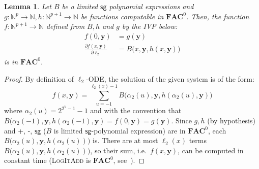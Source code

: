 \documentclass[11pt, oneside]{article}
\newenvironment{toappendix}{}{}
\newcommand{\fun}[1]{\mathsf{#1}}
\newcommand{\sB}{B}
\newcommand{\Nat}{\mathbb{N}}
\newcommand{\AC}{\mathbf{FAC}}
\newcommand{\tu}[1]{\mathbf{#1}}
\newtheorem{lemma}{Lemma}
\theoremstyle{definition}
\begin{document}
\begin{toappendix}
%
%
\begin{lemma}\label{lemma:logitadd-original-3016}
    Let $\sB$ be a limited $\fun{sg}$ polynomial expressions and $g:\Nat^{p} \to \Nat, h:\Nat^{p+1}\to \Nat$ be functions computable in $\AC^0$.
    Then, the function $f:\Nat^{p+1} \to \Nat$ defined from $\sB, h$ and $g$ by the IVP below:
    \begin{align*}
        f(0, \tu y) &= g(\tu y) \\
        \frac{\partial f(x, \tu y)}{\partial \ell_2} &= \sB\big(x, \tu y, h(x, \tu y)\big)
    \end{align*}
    is in $\AC^0$.
\end{lemma}
%
\begin{proof}
    By definition of $\ell_2$-ODE, the solution of the given system is of the form:
    $$
    f(x, \tu y) = \sum^{\ell_2(x)-1}_{u=-1} \sB\big(\alpha_2(u), \tu y, h(\alpha_2(u), \tu y)\big)
    $$
    where $\alpha_2(u)=2^{2^u-1}-1$ and with the convention that $\sB(\alpha_2(-1), \tu y, h(\alpha_2(-1), \tu y)=f(0, \tu y)= g(\tu y)$.
    Since $g, h$ (by hypothesis) and +, -, $\fun{sg}$ ($\sB$ is limited $\fun{sg}$-polynomial expression) are in $\AC^0$, each $\sB\big(\alpha_2(u), \tu y, h(\alpha_2(u))\big)$ is.
    There are at most $\ell_2(x)$ terms $\sB\big(\alpha_2(u), \tu y, h(\alpha_2(u))\big)$, so their sum, i.e.~$f(x, \tu y)$, can be computed in constant time (\textsc{LogItAdd} is $\AC^0$, see~\cite{Vollmer}). 
\end{proof}



\end{toappendix}
\end{document}
